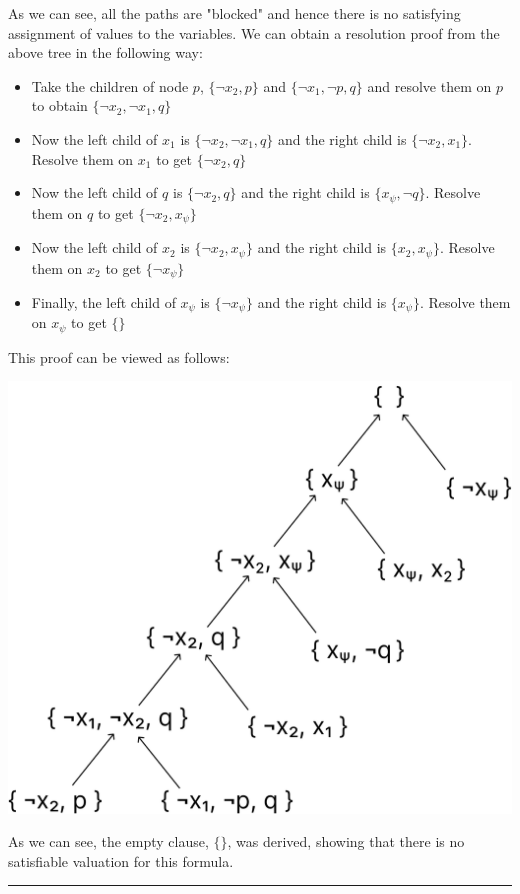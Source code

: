 \documentclass[12pt,letterpaper, onecolumn]{exam}
\begin{document}
\begin{questions}
	As we can see, all the paths are "blocked" and hence there is no satisfying assignment of values to the variables.
	We can obtain a resolution proof from the above tree in the following way:

	\begin{itemize}
		\item Take the children of node $ p $, $ \{ \neg x_2, p \} $ and $ \{\neg x_1, \neg p, q \} $ and resolve them on $ p $ to obtain  $ \{\neg x_2, \neg x_1, q \} $
		\item Now the left child of $ x_1 $ is $ \{\neg x_2, \neg x_1, q \} $ and the right child is $ \{ \neg x_2, x_1 \} $. Resolve them on $ x_1 $ to get $ \{ \neg x_2, q \} $
		\item Now the left child of $ q $ is $ \{ \neg x_2, q \} $ and the right child is $ \{ x_{\psi}, \neg q \} $. Resolve them on $ q $ to get $ \{ \neg x_2, x_{\psi} \} $
		\item Now the left child of $ x_2 $ is $ \{ \neg x_2, x_{\psi} \} $ and the right child is $ \{ x_2, x_{\psi} \} $. Resolve them on $ x_2 $ to get $ \{ \neg x_{\psi} \} $
		\item Finally, the left child of $ x_{\psi} $ is $ \{ \neg x_{\psi} \} $ and the right child is $ \{ x_{\psi} \} $. Resolve them on $ x_{\psi} $ to get $ \{  \} $
	\end{itemize}

	This proof can be viewed as follows:


	\begin{center}
	\includegraphics[scale=0.22]{resolution_proof.png}
	\end{center}

	As we can see, the empty clause, $ \{ \} $, was derived, showing that there is no satisfiable valuation for this formula.


    {\rule{17cm}{0.4pt}}

\end{questions}
\end{document}
